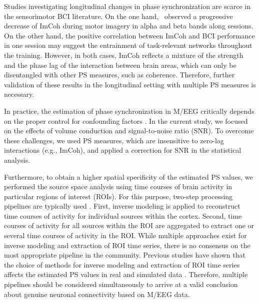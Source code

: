 \medskip

Studies investigating longitudinal changes in phase synchronization are scarce in the sensorimotor BCI literature. On the one hand,~\cite{Corsi2020} observed a progressive decrease of ImCoh during motor imagery in alpha and beta bands along sessions. On the other hand, the positive correlation between ImCoh and BCI performance in one session \citep{Sugata2014, Vidaurre2020} may suggest the entrainment of task-relevant networks throughout the training. However, in both cases, ImCoh reflects a mixture of the strength and the phase lag of the interaction between brain areas, which can only be disentangled with other PS measures, such as coherence. Therefore, further validation of these results in the longitudinal setting with multiple PS measures is necessary.

\medskip

In practice, the estimation of phase synchronization in M/EEG critically depends on the proper control for confounding factors \citep{Bastos2016}. In the current study, we focused on the effects of volume conduction and signal-to-noise ratio (SNR). To overcome these challenges, we used PS measures, which are insensitive to zero-lag interactions (e.g., ImCoh), and applied a correction for SNR in the statistical analysis.

\medskip

Furthermore, to obtain a higher spatial specificity of the estimated PS values, we performed the source space analysis using time courses of brain activity in particular regions of interest (ROIs). For this purpose, two-step processing pipelines are typically used \citep{SchoffelenGross2009}. First, inverse modeling is applied to reconstruct time courses of activity for individual sources within the cortex. Second, time courses of activity for all sources within the ROI are aggregated to extract one or several time courses of activity in the ROI. While multiple approaches exist for inverse modeling and extraction of ROI time series, there is no consensus on the most appropriate pipeline in the community. Previous studies have shown that the choice of methods for inverse modeling and extraction of ROI time series affects the estimated PS values in real and simulated data \citep{Mahjoory2017, Pellegrini2023}. Therefore, multiple pipelines should be considered simultaneously to arrive at a valid conclusion about genuine neuronal connectivity based on M/EEG data.

\medskip

